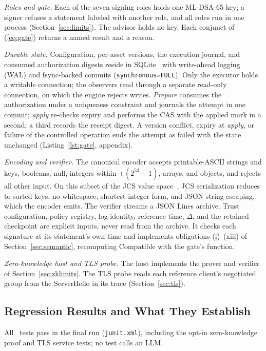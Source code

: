 \documentclass[journal]{IEEEtran}
\newcommand{\Compatible}{\mathrm{Compatible}}
\newcommand{\code}[1]{\texttt{\footnotesize #1}}
\begin{document}
\emph{Roles and gate.} Each of the seven signing roles holds one ML-DSA-65 key; a signer refuses a statement labeled with another role, and all roles run in one process (Section~\ref{sec:limits}). The advisor holds no key. Each conjunct of (\ref{eq:gate}) returns a named result and a reason.

\emph{Durable state.} Configuration, per-asset versions, the execution journal, and consumed authorization digests reside in SQLite \EnvSqlite\ with write-ahead logging (WAL) and fsync-backed commits (\code{synchronous=FULL}). Only the executor holds a writable connection; the observers read through a separate read-only connection, on which the engine rejects writes. \emph{Prepare} consumes the authorization under a uniqueness constraint and journals the attempt in one commit; \emph{apply} re-checks expiry and performs the CAS with the applied mark in a second; a third records the receipt digest. A version conflict, expiry at \emph{apply}, or failure of the controlled operation ends the attempt as failed with the state unchanged (Listing~\ref{lst:gate}, appendix).

\emph{Encoding and verifier.} The canonical encoder accepts printable-ASCII strings and keys, booleans, null, integers within $\pm(2^{53}-1)$, arrays, and objects, and rejects all other input. On this subset of the JCS value space~\cite{jcs}, JCS serialization reduces to sorted keys, no whitespace, shortest integer form, and JSON string escaping, which the encoder emits. The verifier streams a JSON Lines archive. Trust configuration, policy registry, log identity, reference time, $\Delta$, and the retained checkpoint are explicit inputs, never read from the archive. It checks each signature at its statement's own time and implements obligations (i)--(xiii) of Section~\ref{sec:semantic}, recomputing $\Compatible$ with the gate's function.

\emph{Zero-knowledge host and TLS probe.} The host implements the prover and verifier of Section~\ref{sec:zklimits}. The TLS probe reads each reference client's negotiated group from the ServerHello in its trace (Section~\ref{sec:tls}).

\subsection{Regression Results and What They Establish}
\label{sec:tests}
All \NumTests\ tests pass in the final run (\texttt{junit.xml}), including the opt-in zero-knowledge proof and TLS service tests; no test calls an LLM.
\end{document}
